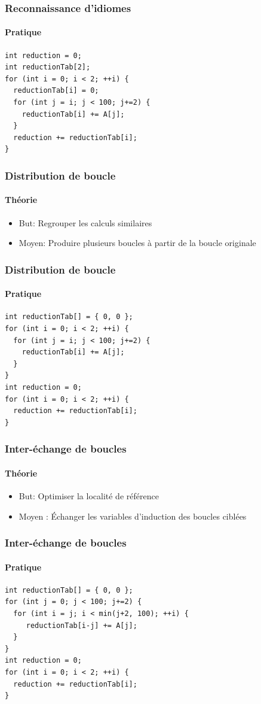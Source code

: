 \documentclass{beamer}
\begin{document}
\begin{frame}[fragile]
\frametitle{Reconnaissance d'idiomes}
\framesubtitle{Pratique}
\begin{lstlisting}
int reduction = 0;
int reductionTab[2];
for (int i = 0; i < 2; ++i) {
  reductionTab[i] = 0;
  for (int j = i; j < 100; j+=2) {
    reductionTab[i] += A[j];
  }
  reduction += reductionTab[i];
}
\end{lstlisting}
\end{frame}

\begin{frame}
\frametitle{Distribution de boucle}
\framesubtitle{Théorie}
\begin{itemize}
\item But: Regrouper les calculs similaires
\item Moyen: Produire plusieurs boucles à partir de la boucle originale
\end{itemize}
\end{frame}

\begin{frame}[fragile]
\frametitle{Distribution de boucle}
\framesubtitle{Pratique}
\begin{lstlisting}
int reductionTab[] = { 0, 0 };
for (int i = 0; i < 2; ++i) {
  for (int j = i; j < 100; j+=2) {
    reductionTab[i] += A[j];
  }
}
int reduction = 0;
for (int i = 0; i < 2; ++i) {
  reduction += reductionTab[i];
}
\end{lstlisting}
\end{frame}

\begin{frame}
\frametitle{Inter-échange de boucles}
\framesubtitle{Théorie}
\begin{itemize}
\item But: Optimiser la localité de référence
\item Moyen : Échanger les variables d'induction des boucles ciblées
\end{itemize}
\end{frame}

\begin{frame}[fragile]
\frametitle{Inter-échange de boucles}
\framesubtitle{Pratique}
\begin{lstlisting}
int reductionTab[] = { 0, 0 };
for (int j = 0; j < 100; j+=2) {
  for (int i = j; i < min(j+2, 100); ++i) {
     reductionTab[i-j] += A[j];
  }
}
int reduction = 0;
for (int i = 0; i < 2; ++i) {
  reduction += reductionTab[i];
}
\end{lstlisting}
\end{frame}
\end{document}
